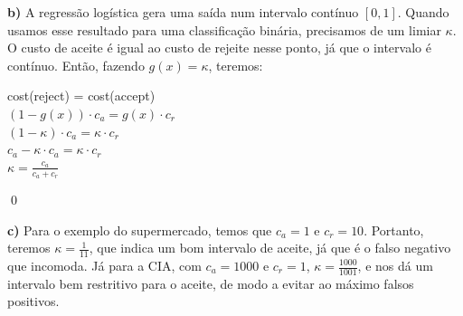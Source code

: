 \documentclass[12pt,letterpaper]{article}
\begin{document}
	\textbf{b)} A regressão logística gera uma saída num intervalo contínuo $ [0,1] $. Quando usamos esse resultado para uma classificação binária, precisamos de um limiar $ \kappa $. O custo de aceite é igual ao custo de rejeite nesse ponto, já que o intervalo é contínuo. Então, fazendo $ g(x) = \kappa $, teremos:
	
	\begin{center}
		cost(reject) = cost(accept) \\
		$ (1-g(x)) \cdot c_a = g(x) \cdot c_r $ \\
		$ (1-\kappa) \cdot c_a = \kappa \cdot c_r $ \\
		$ c_a - \kappa \cdot c_a = \kappa \cdot c_r $ \\
		$ \kappa = \frac{c_a}{c_a + c_r} $
	\end{center}
	
	\qed
	
	\textbf{c)} Para o exemplo do supermercado, temos que $ c_a = 1 $ e $ c_r = 10 $. Portanto, teremos $ \kappa = \frac{1}{11} $, que indica um bom intervalo de aceite, já que é o falso negativo que incomoda. Já para a CIA, com $ c_a = 1000 $ e $ c_r = 1 $, $ \kappa = \frac{1000}{1001} $, e nos dá um intervalo bem restritivo para o aceite, de modo a evitar ao máximo falsos positivos.
	
\end{document}
